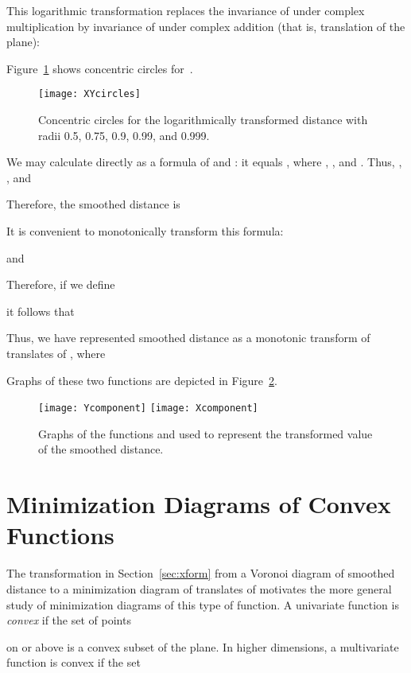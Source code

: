 \documentclass[10pt, conference, compsocconf]{IEEEtran}
\begin{document}
This logarithmic transformation replaces the invariance of  under complex multiplication by invariance of  under complex addition (that is, translation of the plane):

Figure~\ref{fig:XYcircles} shows concentric circles for~.

\begin{figure}[t]
\centering\texttt{[image: XYcircles]}
\caption{Concentric circles for the logarithmically transformed distance  with radii 0.5, 0.75, 0.9, 0.99, and 0.999.}
\label{fig:XYcircles}
\end{figure}

We may calculate  directly as a formula of  and :
it equals , where , , and .
Thus, , , and

Therefore, the smoothed distance is

It is convenient to monotonically transform this formula:

and

Therefore, if we define

it follows that

Thus, we have represented smoothed distance as a monotonic transform of  translates of , where

Graphs of these two functions are depicted in Figure~\ref{fig:components}.

\begin{figure}[t]
\centering\texttt{[image: Ycomponent]}
\qquad\texttt{[image: Xcomponent]}
\caption{Graphs of the functions  and  used to represent the transformed value of the smoothed distance.}
\label{fig:components}
\end{figure}

\section{Minimization Diagrams of Convex Functions}
\label{sec:mdcf}

The transformation in Section~\ref{sec:xform} from a Voronoi diagram of smoothed distance to a minimization diagram of translates of  motivates the more general study of minimization diagrams of this type of function.
A univariate function  is \emph{convex} if the set of points 

on or above  is a convex subset of the plane.  In higher dimensions, a multivariate function  is convex if the set
\end{document}
